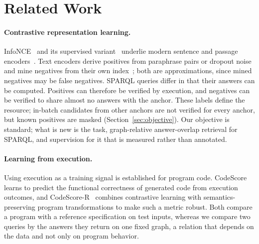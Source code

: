 \documentclass[runningheads]{llncs}
\begin{document}
\section{Related Work}
\label{sec:related}

\paragraph{Contrastive representation learning.}
InfoNCE~\cite{oord2018cpc} and its supervised
variant~\cite{khosla2020supcon} underlie modern sentence and passage
encoders~\cite{reimers2019sbert,gao2021simcse,karpukhin2020dpr,wang2022e5}.
Text encoders derive positives from paraphrase pairs or dropout
noise~\cite{gao2021simcse} and mine negatives from their own
index~\cite{xiong2021ance}; both are approximations, since mined negatives may
be false negatives. SPARQL queries differ in that their answers can be computed.
Positives can therefore be verified by execution, and negatives can be
verified to share almost no answers with the anchor. These labels define the
resource; in-batch candidates from other anchors are not verified for every
anchor, but known positives are masked (Section~\ref{sec:objective}). Our objective is
standard; what is new is the task, graph-relative answer-overlap retrieval for
SPARQL, and supervision for it that is measured rather than annotated.

\paragraph{Learning from execution.}
Using execution as a training signal is established for program code.
CodeScore~\cite{dong2023codescore} learns to predict the functional
correctness of generated code from execution outcomes, and
CodeScore-R~\cite{yang2024codescorer} combines contrastive learning with
semantics-preserving program transformations to make such a metric robust.
Both compare a program with a reference specification on test inputs, whereas
we compare two queries by the answers they return on one fixed graph, a
relation that depends on the data and not only on program behavior.
\end{document}
